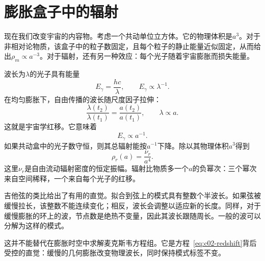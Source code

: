 \section{膨胀盒子中的辐射}

现在我们改变宇宙的内容物。考虑一个共动单位立方体。它的物理体积是\(a^3\)。对于非相对论物质，该盒子中的粒子数固定，且每个粒子的静止能量近似固定，从而给出\(\rho_m\propto a^{-3}\)。对于辐射，还有另一种效应：每个光子随着宇宙膨胀而损失能量。

波长为\(\lambda\)的光子具有能量
\begin{equation}
E_\gamma=\frac{hc}{\lambda},
\qquad
E_\gamma\propto\lambda^{-1}.
\label{eq:c02-photon-energy}
\end{equation}
在均匀膨胀下，自由传播的波长随尺度因子拉伸：
\begin{equation}
\frac{\lambda(t_2)}{\lambda(t_1)}
=\frac{a(t_2)}{a(t_1)},
\qquad
\lambda\propto a.
\label{eq:c02-redshift}
\end{equation}
这就是宇宙学红移。它意味着
\begin{equation}
E_\gamma\propto a^{-1}.
\label{eq:c02-photon-redshift}
\end{equation}
如果共动盒中的光子数守恒，则其总辐射能按\(a^{-1}\)下降。除以其物理体积\(a^3\)得到
\begin{equation}
\boxed{\rho_r(a)=\frac{\nu_r}{a^4}.}
\label{eq:c02-radiation-density}
\end{equation}
这里\(\nu_r\)是自由流动辐射密度的恒定振幅。辐射比物质多一个\(a\)的负幂次：三个幂次来自空间稀释，一个来自每个光子的红移。

吉他弦的类比给出了有用的直觉。拟合到弦上的模式具有整数个半波长。如果弦被缓慢拉长，该整数不能连续变化；相反，波长会调整以适应新的长度。同样，对于缓慢膨胀的环上的波，节点数是绝热不变量，因此其波长跟随周长。一般的波可以分解为这样的模式。

这并不能替代在膨胀时空中求解麦克斯韦方程组。它是方程~\eqref{eq:c02-redshift}背后受控的直觉：缓慢的几何膨胀改变物理波长，同时保持模式标签不变。

\begin{classroomqa}
\end{classroomqa}

